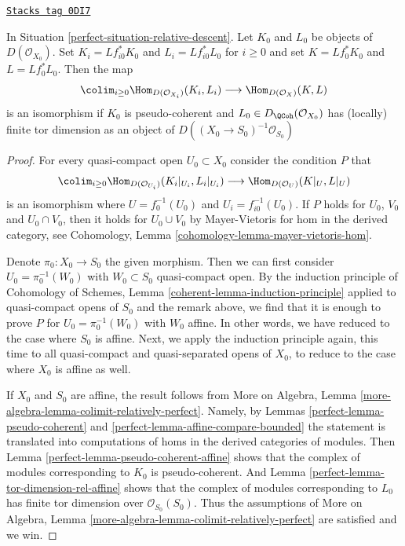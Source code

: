 \begin{lemma}
\label{perfect-lemma-relative-descend-homomorphisms}
\href{https://stacks.math.columbia.edu/tag/0DI7}{\texttt{Stacks tag 0DI7}}

In Situation \ref{perfect-situation-relative-descent}.
Let $K_0$ and $L_0$ be objects of $D(\mathcal{O}_{X_0})$.
Set $K_i = Lf_{i0}^*K_0$ and $L_i = Lf_{i0}^*L_0$ for $i \geq 0$
and set $K = Lf_0^*K_0$ and $L = Lf_0^*L_0$. Then the map
$$
\colim_{i \geq 0} \Hom_{D(\mathcal{O}_{X_i})}(K_i, L_i)
\longrightarrow
\Hom_{D(\mathcal{O}_X)}(K, L)
$$
is an isomorphism if $K_0$ is pseudo-coherent and
$L_0 \in D_\QCoh(\mathcal{O}_{X_0})$ has (locally)
finite tor dimension as an object of
$D((X_0 \to S_0)^{-1}\mathcal{O}_{S_0})$
\end{lemma}

\begin{proof}

For every quasi-compact open $U_0 \subset X_0$ consider the
condition $P$ that
$$
\colim_{i \geq 0} \Hom_{D(\mathcal{O}_{U_i})}(K_i|_{U_i}, L_i|_{U_i})
\longrightarrow
\Hom_{D(\mathcal{O}_U)}(K|_U, L|_U)
$$
is an isomorphism where $U = f_0^{-1}(U_0)$ and $U_i = f_{i0}^{-1}(U_0)$.
If $P$ holds for $U_0$, $V_0$ and $U_0 \cap V_0$, then it holds
for $U_0 \cup V_0$ by Mayer-Vietoris
for hom in the derived category, see
Cohomology, Lemma \ref{cohomology-lemma-mayer-vietoris-hom}.

\medskip\noindent
Denote $\pi_0 : X_0 \to S_0$ the given morphism.
Then we can first consider $U_0 = \pi_0^{-1}(W_0)$ with
$W_0 \subset S_0$ quasi-compact open. By the induction principle of
Cohomology of Schemes, Lemma \ref{coherent-lemma-induction-principle}
applied to quasi-compact opens of $S_0$
and the remark above, we find that it is enough to prove
$P$ for $U_0 = \pi_0^{-1}(W_0)$ with $W_0$ affine.
In other words, we have reduced to the case where $S_0$ is affine.
Next, we apply the induction principle again, this time to all
quasi-compact and quasi-separated opens of $X_0$, to reduce to the
case where $X_0$ is affine as well.

\medskip\noindent
If $X_0$ and $S_0$ are affine, the result follows from
More on Algebra, Lemma \ref{more-algebra-lemma-colimit-relatively-perfect}.
Namely, by Lemmas \ref{perfect-lemma-pseudo-coherent} and
\ref{perfect-lemma-affine-compare-bounded}
the statement is translated into computations of homs in the
derived categories of modules. Then
Lemma \ref{perfect-lemma-pseudo-coherent-affine}
shows that the complex of modules corresponding to $K_0$
is pseudo-coherent. And
Lemma \ref{perfect-lemma-tor-dimension-rel-affine}
shows that the complex of modules corresponding to $L_0$
has finite tor dimension over $\mathcal{O}_{S_0}(S_0)$.
Thus the assumptions of
More on Algebra, Lemma \ref{more-algebra-lemma-colimit-relatively-perfect}
are satisfied and we win.
\end{proof}


